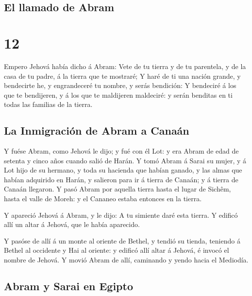 \hypertarget{el-llamado-de-abram}{%
\subsection{El llamado de Abram}\label{el-llamado-de-abram}}

\hypertarget{section-11}{%
\section{12}\label{section-11}}

 Empero Jehová había dicho á Abram: Vete de tu tierra y de
tu parentela, y de la casa de tu padre, á la tierra que te mostraré;
 Y haré de ti una nación grande, y bendecirte he, y
engrandeceré tu nombre, y serás bendición:  Y bendeciré á
los que te bendijeren, y á los que te maldijeren maldeciré: y serán
benditas en ti todas las familias de la tierra.

\hypertarget{la-inmigraciuxf3n-de-abram-a-canauxe1n}{%
\subsection{La Inmigración de Abram a
Canaán}\label{la-inmigraciuxf3n-de-abram-a-canauxe1n}}

 Y fuése Abram, como Jehová le dijo; y fué con él Lot: y era
Abram de edad de setenta y cinco años cuando salió de Harán.
 Y tomó Abram á Sarai su mujer, y á Lot hijo de su hermano,
y toda su hacienda que habían ganado, y las almas que habían adquirido
en Harán, y salieron para ir á tierra de Canaán; y á tierra de Canaán
llegaron.  Y pasó Abram por aquella tierra hasta el lugar de
Sichêm, hasta el valle de Moreh: y el Cananeo estaba entonces en la
tierra.

 Y apareció Jehová á Abram, y le dijo: A tu simiente daré
esta tierra. Y edificó allí un altar á Jehová, que le había aparecido.

 Y pasóse de allí á un monte al oriente de Bethel, y tendió
su tienda, teniendo á Bethel al occidente y Hai al oriente: y edificó
allí altar á Jehová, é invocó el nombre de Jehová.  Y movió
Abram de allí, caminando y yendo hacia el Mediodía.

\hypertarget{abram-y-sarai-en-egipto}{%
\subsection{Abram y Sarai en Egipto}\label{abram-y-sarai-en-egipto}}

